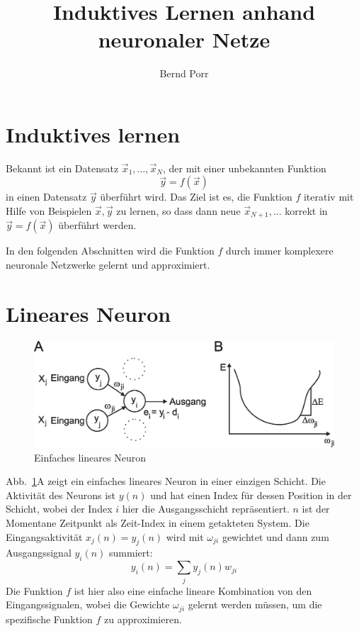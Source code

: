 \documentclass[12pt]{article}
\author{Bernd Porr}
\title{Induktives Lernen anhand neuronaler Netze}
\begin{document}
\maketitle

\section{Induktives lernen}
Bekannt ist ein Datensatz $\vec{x}_1, \ldots, \vec{x}_N$, der mit einer unbekannten Funktion
\begin{equation}
  \vec{y}=f(\vec{x}) \label{inductive}
\end{equation}
in einen Datensatz $\vec{y}$
überführt wird. Das Ziel ist es, die Funktion $f$ iterativ mit Hilfe von Beispielen $\vec{x},\vec{y}$ zu lernen, so dass dann
neue $\vec{x}_{N+1}, \ldots$ korrekt in $\vec{y}=f(\vec{x})$ überführt werden.

In den folgenden Abschnitten wird die Funktion $f$ durch immer komplexere neuronale Netzwerke gelernt und approximiert.

\section{Lineares Neuron}

\begin{figure}[!hbt]
\begin{center}
\mbox{\includegraphics[width=\textwidth]{one_layer}}
\end{center}
\caption{Einfaches lineares Neuron
\label{one_layer}}
\end{figure}

Abb.~\ref{one_layer}A zeigt ein einfaches lineares Neuron in einer
einzigen Schicht. Die Aktivität des Neurons ist $y(n)$ und hat einen
Index für dessen Position in der Schicht, wobei der Index $i$ hier die
Ausgangsschicht repräsentiert. $n$ ist der Momentane Zeitpunkt als
Zeit-Index in einem getakteten System. Die Eingangsaktivität $x_j(n) =
y_j(n)$ wird mit $\omega_{ji}$ gewichtet und dann zum Ausgangssignal
$y_i(n)$ summiert:
\begin{equation}
  y_i(n) = \sum_j y_j(n) w_{ji} \label{linear_sum}
\end{equation}
Die Funktion $f$ ist hier also eine einfache lineare Kombination von den Eingangssignalen, wobei
die Gewichte $\omega_{ji}$ gelernt werden müssen, um die spezifische Funktion $f$ zu approximieren.
\end{document}
